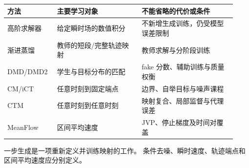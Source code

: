 \begin{longtable}{@{}p{0.19\linewidth}p{0.35\linewidth}p{0.39\linewidth}@{}}
\toprule 方法 & 主要学习对象 & 不能省略的代价或条件 \\ \midrule\endhead
高阶求解器 & 给定瞬时场的数值积分 & 不新增生成训练，仍受模型误差限制 \\
渐进蒸馏 & 教师的短段/完整轨迹映射 & 教师求解与分阶段训练 \\
DMD/DMD2 & 学生与目标分布的匹配 & fake 分数、辅助训练与质量权衡 \\
CM/iCT & 任意时刻到固定端点 & 边界、自举目标与噪声课程 \\
CTM & 任意时刻到任意时刻 & 映射复合、局部监督与代理误差 \\
MeanFlow & 区间平均速度 & JVP、停止梯度及时间对覆盖 \\
\bottomrule
\end{longtable}

\begin{theorytakeaway}
一步生成是一项重新定义并训练映射的工作。
条件去噪、瞬时速度、轨迹端点和区间平均速度应分别定义。
\end{theorytakeaway}

